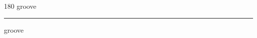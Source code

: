 
\begin{frame}
\begin{center}
\begin{turn}{180}
{\fontsize{2.5cm}{1em}\selectfont groove}
\end{turn}
\vspace{1em}\par  
\hrule
\vspace{1em}\par  
{\fontsize{2.5cm}{1em}\selectfont groove}
\end{center}
\end{frame}
